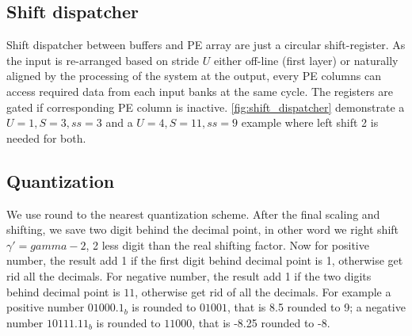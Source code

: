 \subsection{Shift dispatcher}
Shift dispatcher between buffers and PE array are just a circular shift-register. As the input is re-arranged based on stride $U$ either off-line (first layer) or naturally aligned by the processing of the system at the output, every PE columns can access required data from each input banks at the same cycle. The registers are gated if corresponding PE column is inactive. \autoref{fig:shift_dispatcher} demonstrate a $U=1,S=3,ss=3$ and a $U=4,S=11,ss=9$ example where left shift 2 is needed for both.  

\subsection{Quantization}
We use round to the nearest quantization scheme. After the final scaling and shifting, we save two digit behind the decimal point, in other word we right shift $\gamma'=gamma-2$, 2 less digit than the real shifting factor. Now for positive number, the result add 1 if the first digit behind decimal point is 1, otherwise get rid all the decimals. For negative number, the result add 1 if the two digits behind decimal point is $11$, otherwise get rid of all the decimals. For example a positive number $01000.1_b$ is rounded to $01001$, that is 8.5 rounded to 9; a negative number $10111.11_b$ is rounded to $11000$, that is -8.25 rounded to -8. 

